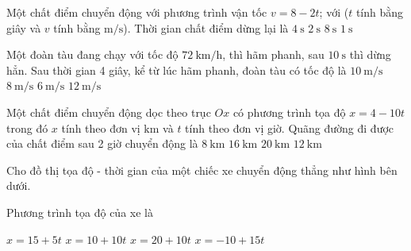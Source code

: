 \begin{ex}
	Một chất điểm chuyển động với phương trình vận tốc $v = 8 - 2t$; với ($t$ tính bằng giây và $v$ tính bằng $\si{\meter/\second}$). Thời gian chất điểm dừng lại là
	\choice
	{\True $\SI{4}{\second}$}
	{$\SI{2}{\second}$}
	{$\SI{8}{\second}$}
	{$\SI{1}{\second}$}
	\loigiai{}
\end{ex}

\begin{ex}
	Một đoàn tàu đang chạy với tốc độ $\SI{72}{\kilo\meter/\hour}$, thì hãm phanh, sau $\SI{10}{\second}$ thì dừng hẳn. Sau thời gian 4 giây, kể từ lúc hãm phanh, đoàn tàu có tốc độ là
	\choice
	{$\SI{10}{\meter/\second}$}
	{$\SI{8}{\meter/\second}$}
	{$\SI{6}{\meter/\second}$}
	{\True $\SI{12}{\meter/\second}$}
	\loigiai{}
\end{ex}
\begin{ex}
	Một chất điểm chuyển động dọc theo trục $Ox$ có phương trình tọa độ $x=4-10t$ trong đó $x$ tính theo đơn vị $\si{\kilo\meter}$ và $t$ tính theo đơn vị giờ. Quãng đường đi được của chất điểm sau 2 giờ chuyển động là
	\choice
	{$\SI{8}{\kilo\meter}$}
	{$\SI{16}{\kilo\meter}$}
	{\True $\SI{20}{\kilo\meter}$}
	{$\SI{12}{\kilo\meter}$}
	\loigiai{}
\end{ex}
\begin{ex}
	Cho đồ thị tọa độ - thời gian của một chiếc xe chuyển động thẳng như hình bên dưới. 
	\begin{center}
	\end{center}
	Phương trình tọa độ của xe là
	
	\choice
	{$x=15+5t$}
	{\True $x=10+10t$}
	{$x=20+10t$}
	{$x=-10+15t$}
	\loigiai{}
\end{ex}


